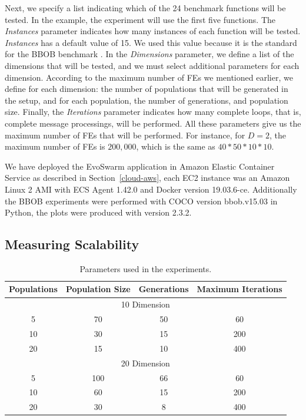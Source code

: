 \documentclass[review]{elsarticle}
\begin{document}
Next, we specify a list indicating which of the 24 benchmark
functions will be tested. In the example, the experiment will use the first five
functions.  The {\em Instances} parameter indicates how many instances of each
function will be tested. {\em Instances}  has a default value of 15. We used this
value because it is the standard for the BBOB benchmark \cite{hansen2016coco}.
In the {\em Dimensions} parameter, we define a list of the dimensions that will
be tested, and we must select additional parameters for each dimension.
According to the maximum number of FEs we mentioned
earlier, we define for each dimension: the number of populations that will be
generated in the setup, and for each population,  the number of generations, and
population size. Finally, the {\em Iterations} parameter indicates how many
complete loops, that is, complete message processings, will be performed.
All these parameters give us the maximum
number of FEs that will be performed. For instance, for $D = 2$, the maximum
number of FEs is $200,000$, which is the same as $40*50*10*10$.

We have deployed the EvoSwarm application in Amazon Elastic Container Service as 
described in Section~\ref{cloud-aws}, each EC2 instance was an Amazon Linux 2 AMI with 
ECS Agent 1.42.0 and Docker version 19.03.6-ce. Additionally the BBOB experiments 
were performed with COCO \cite{hansen2016coco} version bbob.v15.03
in Python, the plots were produced with version 2.3.2.

\subsection{Measuring Scalability}
\label{sec:exp1}

\begin{table}[h!tbp]
  \small
  \caption{Parameters used in the experiments.
  }
  \label{tab:params:10}
  \vspace{0.25cm}
  \centering
  \small
  \begin{tabular}{|c|c|c|c|}
    \hline
      Populations & Population Size & Generations & Maximum Iterations  \\ \hline
                 \multicolumn{4}{|c|}{10 Dimension } \\ \hline
         5        &  70             &        50   &   60                \\ \hline
         10       &  30             &        15   &   200                \\ \hline
         20       &  15             &        10   &   400                \\ \hline
                  \multicolumn{4}{|c|}{20 Dimension } \\ \hline
         5        &  100            &        66   &   60                \\ \hline
         10       &  60             &        15   &   200                \\ \hline
         20       &  30             &        8   &    400                \\ \hline
  
  \end{tabular}
\end{table}
\end{document}
